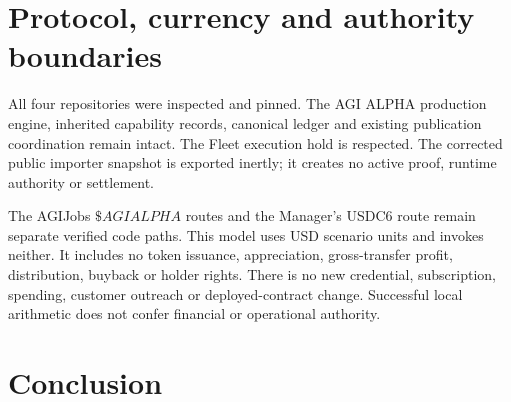 \documentclass[11pt,a4paper]{article}
\begin{document}
\section{Protocol, currency and authority boundaries}
All four repositories were inspected and pinned. The AGI ALPHA production engine, inherited
capability records, canonical ledger and existing publication coordination remain intact.
The Fleet execution hold is respected. The corrected public importer snapshot is exported inertly;
it creates no active proof, runtime authority or settlement.

The AGIJobs \(\$AGIALPHA\) routes and the Manager's USDC6 route remain separate verified code paths.
This model uses USD scenario units and invokes neither. It includes no token issuance,
appreciation, gross-transfer profit, distribution, buyback or holder rights.
There is no new credential, subscription, spending, customer outreach or deployed-contract change.
Successful local arithmetic does not confer financial or operational authority.



\clearpage\section{Conclusion}


\newpage
\appendix
\end{document}
